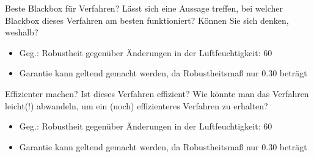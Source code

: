 \documentclass{ocbeameruni}
\begin{document}
\begin{frame}{Beste Blackbox für Verfahren?}
Lässt sich eine Aussage treffen, bei welcher Blackbox dieses Verfahren am besten funktioniert?
Können Sie sich denken, weshalb?
    \begin{itemize}
    \item Geg.: Robustheit gegenüber Änderungen in der Luftfeuchtigkeit: 60 %
    \item Garantie kann geltend gemacht werden, da Robustheitsmaß nur 0.30 beträgt
    \end{itemize}
\end{frame}


\begin{frame}{Effizienter machen?}
Ist dieses Verfahren effizient? Wie könnte man das Verfahren leicht(!) abwandeln, um ein (noch)
effizienteres Verfahren zu erhalten?
    \begin{itemize}
    \item Geg.: Robustheit gegenüber Änderungen in der Luftfeuchtigkeit: 60 %
    \item Garantie kann geltend gemacht werden, da Robustheitsmaß nur 0.30 beträgt
    \end{itemize}
\end{frame}
\end{document}
